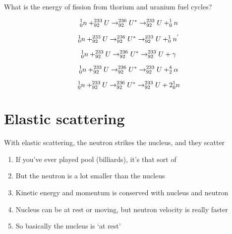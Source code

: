 \documentclass[aspectratio=1610,pdftex,dvipsnames,compress,xcolor={dvipsnames}]{beamer}
\begin{document}
\begin{frame}{What is the energy of fission from thorium and uranium fuel cycles?}

    \begin{equation}
        \LARGE
        ^1_0n + ^{233}_{92}U \rightarrow ^{236}_{92}U^{*} \rightarrow ^{233}_{92}U + ^1_0n 
    \end{equation}

    \begin{equation}
        \LARGE
        ^1_0n + ^{233}_{92}U \rightarrow ^{236}_{92}U^{*} \rightarrow ^{233}_{92}U + ^1_0n^{'}
    \end{equation}

    \begin{equation}
        \LARGE
        ^1_0n + ^{233}_{92}U \rightarrow ^{236}_{92}U^{*} \rightarrow ^{233}_{92}U + \gamma   
    \end{equation}

    \begin{equation}
        \LARGE
        ^1_0n + ^{233}_{92}U \rightarrow ^{236}_{92}U^{*} \rightarrow ^{233}_{92}U + ^{4}_{2}\alpha   
    \end{equation}

    \begin{equation}
        \LARGE
        ^1_0n + ^{233}_{92}U \rightarrow ^{236}_{92}U^{*} \rightarrow ^{233}_{92}U + 2^1_0n  
    \end{equation}

\end{frame}


\section{Elastic scattering}


\addtocounter{framenumber}{-1} 
\begin{frame}{With elastic scattering, the neutron strikes the nucleus, and they scatter}
    \begin{enumerate}[series=outerlist,topsep=0pt,itemsep=21pt,leftmargin=*,label=(\arabic*)]
        \item[]If you’ve ever played pool (billiards), it’s that sort of
        \item[]But the neutron is a lot smaller than the nucleus
        \item[]Kinetic energy and momentum is conserved with nucleus and neutron
        \item[]Nucleus can be at rest or moving, but neutron velocity is really faster
        \item[]So basically the nucleus is `at rest'
    \end{enumerate}
\end{frame}
\end{document}
